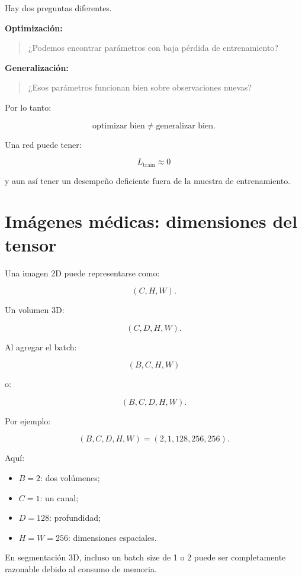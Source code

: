 \documentclass[
  letterpaper,
  DIV=11,
  numbers=noendperiod]{scrartcl}
\providecommand{\tightlist}{%
  \setlength{\itemsep}{0pt}\setlength{\parskip}{0pt}}
\begin{document}
Hay dos preguntas diferentes.

\textbf{Optimización:}

\begin{quote}
¿Podemos encontrar parámetros con baja pérdida de entrenamiento?
\end{quote}

\textbf{Generalización:}

\begin{quote}
¿Esos parámetros funcionan bien sobre observaciones nuevas?
\end{quote}

Por lo tanto:

\[
\boxed{
\text{optimizar bien}
\neq
\text{generalizar bien}.
}
\]

Una red puede tener:

\[
L_{\mathrm{train}}\approx0
\]

y aun así tener un desempeño deficiente fuera de la muestra de
entrenamiento.

\section{Imágenes médicas: dimensiones del
tensor}\label{imuxe1genes-muxe9dicas-dimensiones-del-tensor}

Una imagen 2D puede representarse como:

\[
(C,H,W).
\]

Un volumen 3D:

\[
(C,D,H,W).
\]

Al agregar el batch:

\[
(B,C,H,W)
\]

o:

\[
(B,C,D,H,W).
\]

Por ejemplo:

\[
(B,C,D,H,W)
=
(2,1,128,256,256).
\]

Aquí:

\begin{itemize}
\tightlist
\item
  \(B=2\): dos volúmenes;
\item
  \(C=1\): un canal;
\item
  \(D=128\): profundidad;
\item
  \(H=W=256\): dimensiones espaciales.
\end{itemize}

En segmentación 3D, incluso un batch size de 1 o 2 puede ser
completamente razonable debido al consumo de memoria.
\end{document}
